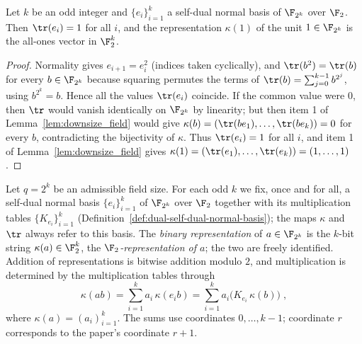 \begin{lemma}\label{lem:one}
	\leanok
	Let $k$ be an odd integer and $\{e_i\}_{i=1}^k$ a self-dual normal basis of
	$\F_{2^k}$ over $\F_2$. Then $\tr(e_i) = 1$ for all $i$, and the
	representation $\kappa(1)$ of the unit $1 \in \F_{2^k}$ is the all-ones
	vector in $\F_2^k$.
\end{lemma}
\begin{proof}
	\leanok
	Normality gives $e_{i+1} = e_i^2$ (indices taken cyclically), and
	$\tr(b^2) = \tr(b)$ for every $b \in \F_{2^k}$ because squaring permutes the
	terms of $\tr(b) = \sum_{j=0}^{k-1} b^{2^j}$, using $b^{2^k} = b$. Hence all
	the values $\tr(e_i)$ coincide. If the common value were $0$, then $\tr$
	would vanish identically on $\F_{2^k}$ by linearity; but then item 1 of
	Lemma~\ref{lem:downsize_field} would give $\kappa(b) =
	(\tr(b e_1), \dots, \tr(b e_k)) = 0$ for every $b$, contradicting the
	bijectivity of $\kappa$. Thus $\tr(e_i) = 1$ for all $i$, and item 1 of
	Lemma~\ref{lem:downsize_field} gives
	$\kappa(1) = (\tr(e_1), \dots, \tr(e_k)) = (1, \dots, 1)$.
\end{proof}

\begin{definition}\label{def:binary-representation}
	\leanok
	Let $q = 2^k$ be an admissible field size. For each odd $k$ we fix, once and
	for all, a self-dual normal basis $\{e_i\}_{i=1}^k$ of $\F_{2^k}$ over
	$\F_2$ together with its multiplication tables
	$\{K_{e_i}\}_{i=1}^k$ (Definition~\ref{def:dual-self-dual-normal-basis});
	the maps $\kappa$ and $\tr$ always refer to this basis. The \emph{binary
	representation} of $a \in \F_{2^k}$ is the $k$-bit string
	$\kappa(a) \in \F_2^k$, the \emph{$\F_2$-representation of $a$}; the two are
	freely identified. Addition of representations is bitwise addition modulo
	$2$, and multiplication is determined by the multiplication tables through
	\begin{equation}\label{eq:eq-mult}
		\kappa(ab) = \sum_{i=1}^k a_i\, \kappa(e_i b)
		= \sum_{i=1}^k a_i \bigl(K_{e_i}\, \kappa(b)\bigr)\;,
	\end{equation}
	where $\kappa(a) = (a_i)_{i=1}^k$.
	The sums use coordinates $0,\ldots,k-1$; coordinate $r$ corresponds to the
	paper's coordinate $r+1$.
\end{definition}

